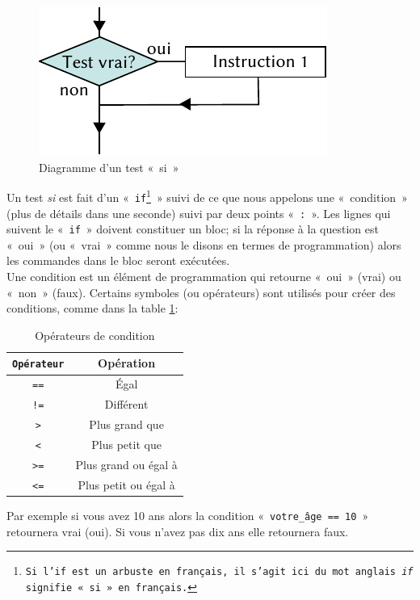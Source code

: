 \begin{figure}[ht]
\centering
\includegraphics[scale=1.5]{images/Cf-if-fr.pdf}
\caption{Diagramme d'un test « si »}
\label{fig:Cf-if-fr}
\end{figure}

Un test \emph{si} est fait d'un « \texttt{if\footnote{Si l'if est un arbuste en français, il s'agit ici du mot anglais \emph{if} signifie « si » en français.}} » suivi de ce que nous appelons une « condition »  (plus de  détails dans une seconde) suivi par deux points « \verb+:+ ». Les lignes qui suivent le « \texttt{if} » doivent constituer un bloc; si la réponse à la question est « oui » (ou « vrai » comme nous le disons en termes de programmation) alors les commandes dans le bloc seront exécutées.\\

Une condition est un élément de programmation qui retourne « oui » (vrai) ou « non » (faux). Certains symboles (ou opérateurs) sont utilisés pour créer des conditions, comme dans la table \ref{table:opcond}:

\begin{table}[h!]
\begin{center}
\begin{tabular}{|c|c|}
\hline
\texttt{Opérateur}&Opération\\
\hline
\texttt{==}&Égal\\
\hline
\texttt{!=}&Différent\\
\hline
\texttt{>}&Plus grand que\\
\hline
\texttt{<}&Plus petit que\\
\hline
\texttt{>=}&Plus grand ou égal à\\
\hline
\texttt{<=}&Plus petit ou égal à\\
\hline
\end{tabular}
\end{center}
\caption{Opérateurs de condition}
\label{table:opcond}
\end{table}

Par exemple si vous avez 10 ans alors la condition « \texttt{votre\_âge == 10} » retournera vrai (oui). Si vous n'avez pas dix ans  elle retournera faux. \\

